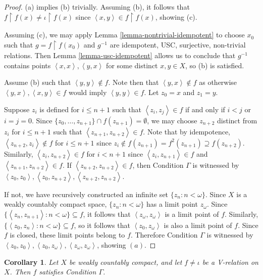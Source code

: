 \documentclass{article}
\newcommand{\tuple}[1]{\left\langle{#1}\right\rangle}
\newcommand{\rest}{\upharpoonright}
\theoremstyle{plain}
\newtheorem{corollary}[theorem]{Corollary}
\theoremstyle{definition}
\theoremstyle{remark}
\begin{document}
\begin{proof}
  (a) implies (b) trivially. Assuming (b), it follows that
  \(f\rest f(x)\not=\iota\rest f(x)\) since \(\tuple{x,y}\in f\rest f(x)\),
  showing (c).
  
  Assuming (c), we may apply Lemma \ref{lemma-nontrivial-idempotent} 
  to choose \(x_0\)
  such that \(g=f\rest f(x_0)\) and \(g^{-1}\) are idempotent, USC,
  surjective, non-trivial relations. 
  Then Lemma \ref{lemma-usc-idempotent} allows us to conclude that
  \(g^{-1}\) contains points \(\tuple{x,x},\tuple{y,x}\) for some distinct
  \(x,y\in X\), so (b) is satisfied.
  
  Assume (b) such that \(\tuple{y,y}\not\in f\).
  Note then that \(\tuple{y,x}\not\in f\) as otherwise
  \(\tuple{y,x},\tuple{x,y}\in f\) would imply \(\tuple{y,y}\in f\).
  Let \(z_0=x\) and \(z_1=y\). 
  
  Suppose \(z_i\) is defined for \(i\leq n+1\) such that
  \(\tuple{z_i,z_j}\in f\) if and only if \(i<j\) or \(i=j=0\).
  Since \(\{z_0,\dots,z_{n+1}\}\cap f(z_{n+1})=\emptyset\),
  we may choose \(z_{n+2}\) distinct from \(z_i\) for \(i\leq n+1\) 
  such that \(\tuple{z_{n+1},z_{n+2}}\in f\).
  Note that by idempotence, \(\tuple{z_{n+2},z_i}\not\in f\)
  for \(i\leq n+1\) since 
  \(z_i\not\in f(z_{n+1})=f^2(z_{n+1})\supseteq f(z_{n+2})\).
  Similarly, \(\tuple{z_i,z_{n+2}}\in f\) for \(i<n+1\) since
  \(\tuple{z_i,z_{n+1}}\in f\) and \(\tuple{z_{n+1},z_{n+2}}\in f\).
  If \(\tuple{z_{n+2},z_{n+2}}\in f\),
  then Condition \(\Gamma\) is witnessed by 
  \(\tuple{z_0,z_0},\tuple{z_0,z_{n+2}},\tuple{z_{n+2},z_{n+2}}\).
  
  If not, we have recursively constructed an infinite
  set \(\{z_n:n<\omega\}\).
  Since \(X\) is a weakly countably compact space, 
  \(\{z_n:n<\omega\}\) has a limit point \(z_\omega\).
  Since \(\{\tuple{z_n,z_{n+1}}:n<\omega\}\subseteq f\), it follows that
  \(\tuple{z_\omega,z_\omega}\) is a limit point of \(f\).
  Similarly, \(\{\tuple{z_0,z_n}:n<\omega\}\subseteq f\),
  so it follows that \(\tuple{z_0,z_\omega}\)
  is also a limit point of \(f\). Since \(f\) is closed,
  these limit points belong to \(f\).
  Therefore Condition \(\Gamma\) is witnessed by
  \(\tuple{z_0,z_0},\tuple{z_0,z_\omega},\tuple{z_\omega,z_\omega}\),
  showing \((a)\).
\end{proof}

\begin{corollary}Let $X$ be weakly countably compact, and let $f \ne \iota$ be a V-relation on $X$. Then $f$ satisfies Condition $\Gamma$.
\end{corollary}
\end{document}
